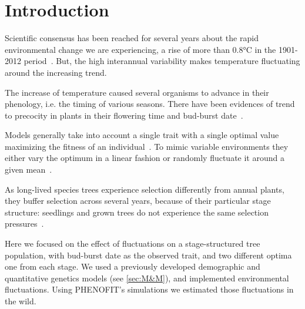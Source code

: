 \label{sec:Intro}
\section*{Introduction}

Scientific consensus has been reached for several years about the rapid environmental change we are experiencing, a rise of more than 0.8°C in the 1901-2012 period~\citep{stocker_ipcc_2013}. But, the high interannual variability makes temperature fluctuating around the increasing trend.

The increase of temperature caused several organisms to advance in their phenology, i.e. the timing of various seasons. There have been evidences of trend to precocity in plants in their flowering time and bud-burst date~\citep{alberto_adaptive_2011, gienapp_predicting_2013}.

Models generally take into account a single trait with a single optimal value maximizing the fitness of an individual~\citep{lande_quantitative_1982}. To mimic variable environments they either vary the optimum in a linear fashion or randomly fluctuate it around a given mean~\citep{lande_role_1996}.

As long-lived species trees experience selection differently from annual plants, they buffer selection across several years, because of their particular stage structure: seedlings and grown trees do not experience the same selection pressures~\citep{lande_quantitative_1982, coulson_dynamics_2008, barfield_evolution_2011, engen_evolution_2011}. 

Here we focused on the effect of fluctuations on a stage-structured tree population, with bud-burst date as the observed trait, and two different optima one from each stage.
We used a previously developed demographic and quantitative genetics models (see \ref{sec:M&M}), and implemented environmental fluctuations. Using \textsc{PHENOFIT}'s simulations we estimated those fluctuations in the wild.